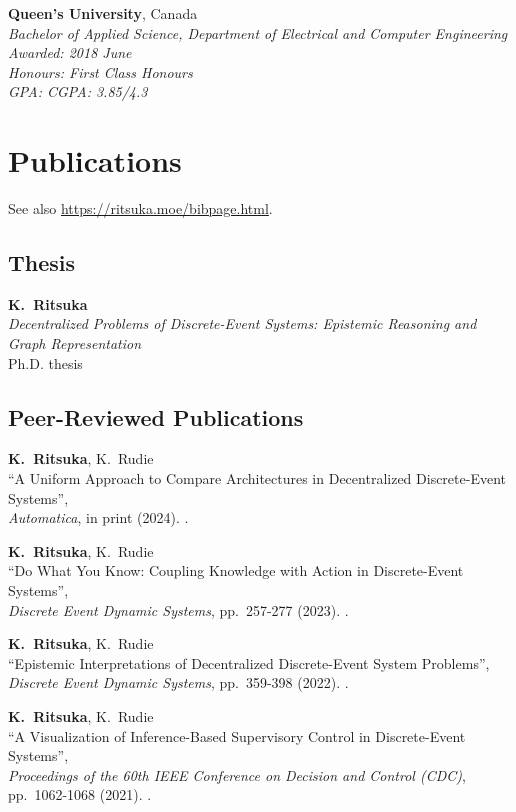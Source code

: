 \documentclass[margin]{res}
\begin{document}
\begin{resume}
\textbf{Queen's University}, Canada\\
{\sl Bachelor of Applied Science, Department of Electrical and Computer Engineering\\
Awarded:
\hfill 2018 June\\
Honours:
\hfill First Class Honours\\
GPA: 
\hfill CGPA: 3.85/4.3}


\section{Publications}

See also \url{https://ritsuka.moe/bibpage.html}.

\subsection{Thesis}

{\bf K.~Ritsuka}\\
\textit{Decentralized Problems of Discrete-Event Systems:
Epistemic Reasoning and Graph Representation}\\
Ph.D. thesis

\subsection{Peer-Reviewed Publications}

{\bf K.~Ritsuka}, K.~Rudie\\
``A Uniform Approach to Compare Architectures in Decentralized Discrete-Event Systems'',\\
\emph{Automatica}, in print (2024).
.

{\bf K.~Ritsuka}, K.~Rudie\\
``Do What You Know: Coupling Knowledge with Action in Discrete-Event Systems'',\\
\emph{Discrete Event Dynamic Systems}, pp.~257-277 (2023).
.

{\bf K.~Ritsuka}, K.~Rudie\\
``Epistemic Interpretations of Decentralized Discrete-Event System Problems'',\\
\emph{Discrete Event Dynamic Systems}, pp.~359-398 (2022).
.

{\bf K.~Ritsuka}, K.~Rudie\\
``A Visualization of Inference-Based Supervisory Control in Discrete-Event Systems'',\\
\emph{Proceedings of the 60th IEEE Conference on Decision and Control (CDC)}, pp.~1062-1068 (2021).
.


\end{resume}
\end{document}
